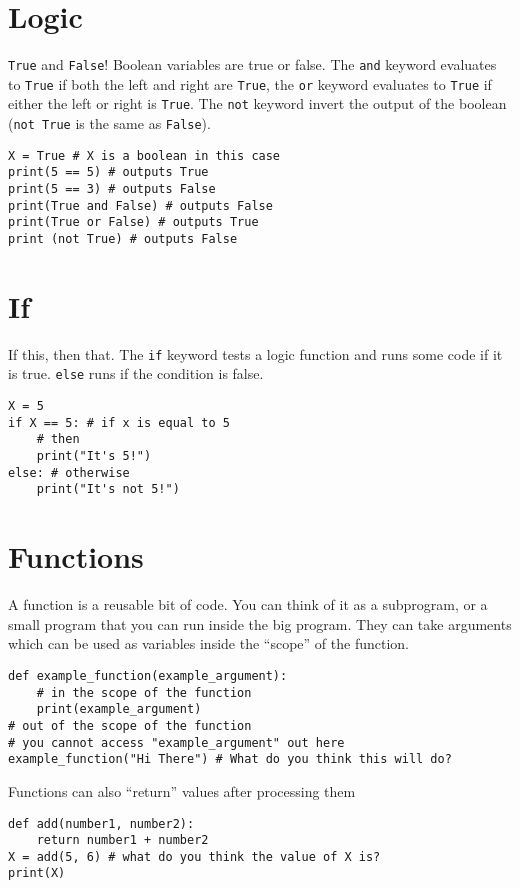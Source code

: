 \documentclass{assignments}
\begin{document}
\section*{Logic}
\label{sec:org715d233}
\texttt{True} and \texttt{False}! Boolean variables are true or false. The \texttt{and} keyword evaluates
to \texttt{True} if both the left and right are \texttt{True}, the \texttt{or} keyword evaluates to \texttt{True} if
either the left or right is \texttt{True}. The \texttt{not} keyword invert
the output of the boolean (\texttt{not True} is the same as \texttt{False}).
\begin{verbatim}
X = True # X is a boolean in this case
print(5 == 5) # outputs True
print(5 == 3) # outputs False
print(True and False) # outputs False
print(True or False) # outputs True
print (not True) # outputs False
\end{verbatim}
\section*{If}
\label{sec:org287827d}
If this, then that. The \texttt{if} keyword tests a logic function and runs some code
if it is true. \texttt{else} runs if the condition is false.

\begin{verbatim}
X = 5
if X == 5: # if x is equal to 5
    # then
    print("It's 5!")
else: # otherwise
    print("It's not 5!")
\end{verbatim}
\section*{Functions}
\label{sec:org0c88b42}
A function is a reusable bit of code. You can think of it as a subprogram, or a
small program that you can run inside the big program. They can take arguments
which can be used as variables inside the ``scope'' of the function.
\begin{verbatim}
def example_function(example_argument):
    # in the scope of the function
    print(example_argument)
# out of the scope of the function
# you cannot access "example_argument" out here
example_function("Hi There") # What do you think this will do?
\end{verbatim}
Functions can also ``return'' values after processing them
\begin{verbatim}
def add(number1, number2):
    return number1 + number2
X = add(5, 6) # what do you think the value of X is?
print(X)
\end{verbatim}
\end{document}
